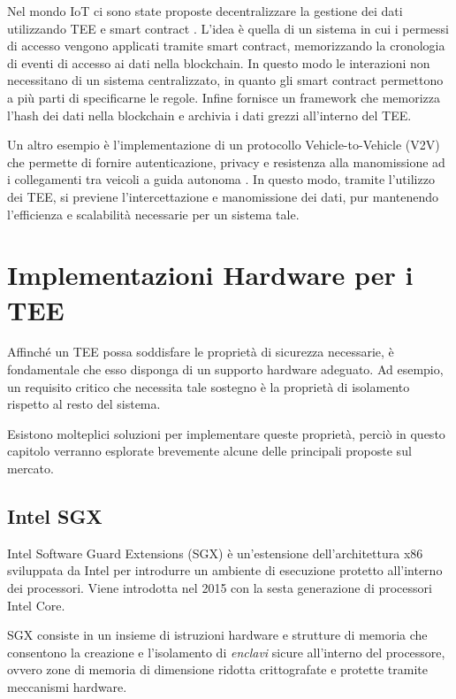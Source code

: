 \documentclass[12pt,italian]{report}
\begin{document}
	\bigbreak
	
	Nel mondo IoT ci sono state proposte decentralizzare la gestione dei dati utilizzando TEE e smart contract \cite{iotblockchain}. L'idea è quella di un sistema in cui i permessi di accesso vengono applicati tramite smart contract, memorizzando la cronologia di eventi di accesso ai dati nella blockchain. In questo modo le interazioni non necessitano di un sistema centralizzato, in quanto gli smart contract permettono a più parti di specificarne le regole. Infine fornisce un framework che memorizza l'hash dei dati nella blockchain e archivia i dati grezzi all'interno del TEE.
	
	\bigbreak
	
	Un altro esempio è l'implementazione di un protocollo Vehicle-to-Vehicle (V2V) che permette di fornire autenticazione, privacy e resistenza alla manomissione ad i collegamenti tra veicoli a guida autonoma \cite{teeuses_vehicles}. In questo modo, tramite l'utilizzo dei TEE, si previene l'intercettazione e manomissione dei dati, pur mantenendo l'efficienza e scalabilità necessarie per un sistema tale.
	
	\newpage
	
	\section{Implementazioni Hardware per i TEE}
	\label{sec:supporto-hw}
	Affinché un TEE possa soddisfare le proprietà di sicurezza necessarie, è fondamentale che esso disponga di un supporto hardware adeguato. Ad esempio, un requisito critico che necessita tale sostegno è la proprietà di isolamento rispetto al resto del sistema.
	
	Esistono molteplici soluzioni per implementare queste proprietà, perciò in questo capitolo verranno esplorate brevemente alcune delle principali proposte sul mercato.
	
	\subsection{Intel SGX}
	\label{subsec:sgx}
	Intel Software Guard Extensions (SGX) è un'estensione dell'architettura x86 sviluppata da Intel per introdurre un ambiente di esecuzione protetto all'interno dei processori. Viene introdotta nel 2015 con la sesta generazione di processori Intel Core.
	
	SGX consiste in un insieme di istruzioni hardware e strutture di memoria che consentono la creazione e l'isolamento di \textit{enclavi} sicure all'interno del processore, ovvero zone di memoria di dimensione ridotta crittografate e protette tramite meccanismi hardware. 
	
\end{document}
